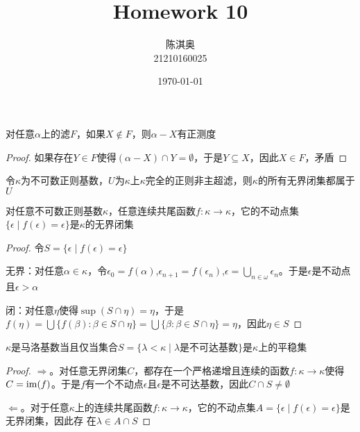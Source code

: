 \documentclass[11pt]{article}
\author{陈淇奥\\21210160025}
\date{\today}
\title{Homework 10}
\begin{document}
\maketitle
\begin{exercise}
对任意\(\alpha\)上的滤\(F\)，如果\(X\notin F\)，则\(\alpha-X\)有正测度
\end{exercise}

\begin{proof}
如果存在\(Y\in F\)使得\((\alpha-X)\cap Y=\emptyset\)，于是\(Y\subseteq X\)，因此\(X\in F\)，矛盾
\end{proof}

\begin{exercise}
令\(\kappa\)为不可数正则基数，\(U\)为\(\kappa\)上\(\kappa\)完全的正则非主超滤，则\(\kappa\)的所有无界闭集都属于\(U\)
\end{exercise}


\begin{exercise}
对任意不可数正则基数\(\kappa\)，任意连续共尾函数\(f:\kappa\to\kappa\)，它的不动点集\(\{\epsilon\mid f(\epsilon)=\epsilon\}\)是\(\kappa\)的无界闭集
\end{exercise}

\begin{proof}
令\(S=\{\epsilon\mid f(\epsilon)=\epsilon\}\)

无界：对任意\(\alpha\in\kappa\)，令\(\epsilon_0=f(\alpha)\),\(\epsilon_{n+1}=f(\epsilon_n)\),\(\epsilon=\bigcup_{n\in\omega}\epsilon_n\)。于是\(\epsilon\)是不动点且\(\epsilon>\alpha\)

闭：对任意\(\eta\)使得\(\sup(S\cap\eta)=\eta\)，于是\(f(\eta)=\bigcup\{f(\beta):\beta\in S\cap\eta\}=\bigcup\{\beta:\beta\in S\cap\eta\}=\eta\)，因此\(\eta\in S\)
\end{proof}

\begin{exercise}
\(\kappa\)是马洛基数当且仅当集合\(S=\{\lambda<\kappa\mid\lambda\text{是不可达基数}\}\)是\(\kappa\)上的平稳集
\end{exercise}

\begin{proof}
\(\Rightarrow\)。对任意无界闭集\(C\)，都存在一个严格递增且连续的函数\(f:\kappa\to\kappa\)使得\(C=\operatorname{im}(f)\)。于是\(f\)有一个不动点\(\epsilon\)且\(\epsilon\)是不可达基数，因此\(C\cap S\neq\emptyset\)

\(\Leftarrow\)。对于任意\(\kappa\)上的连续共尾函数\(f:\kappa\to\kappa\)，它的不动点集\(A=\{\epsilon\mid f(\epsilon)=\epsilon\}\)是无界闭集，因此存
在\(\lambda\in A\cap S\)
\end{proof}
\end{document}
